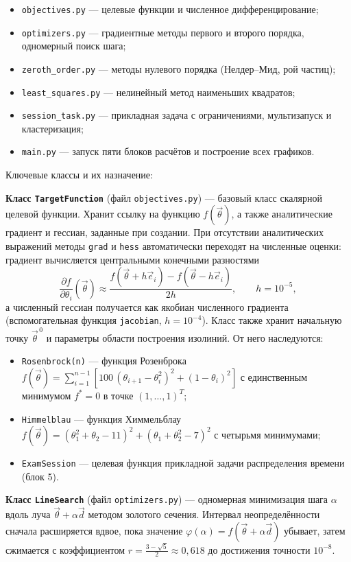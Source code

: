 \documentclass[a4paper]{article}
\begin{document}
\begin{itemize}
    \item \texttt{objectives.py} — целевые функции и численное дифференцирование;
    \item \texttt{optimizers.py} — градиентные методы первого и второго порядка, одномерный поиск шага;
    \item \texttt{zeroth\_order.py} — методы нулевого порядка (Нелдер–Мид, рой частиц);
    \item \texttt{least\_squares.py} — нелинейный метод наименьших квадратов;
    \item \texttt{session\_task.py} — прикладная задача с ограничениями, мультизапуск и кластеризация;
    \item \texttt{main.py} — запуск пяти блоков расчётов и построение всех графиков.
\end{itemize}

Ключевые классы и их назначение:

\textbf{Класс \texttt{TargetFunction}} (файл \texttt{objectives.py}) — базовый класс скалярной целевой функции. Хранит ссылку на функцию $f(\vec{\theta})$, а также аналитические градиент и гессиан, заданные при создании. При отсутствии аналитических выражений методы \texttt{grad} и \texttt{hess} автоматически переходят на численные оценки: градиент вычисляется центральными конечными разностями
\[
    \frac{\partial f}{\partial \theta_i}(\vec{\theta}) \approx
    \frac{f(\vec{\theta} + h \vec{e}_i) - f(\vec{\theta} - h \vec{e}_i)}{2h},
    \qquad h = 10^{-5},
\]
а численный гессиан получается как якобиан численного градиента (вспомогательная функция \texttt{jacobian}, $h = 10^{-4}$). Класс также хранит начальную точку $\vec{\theta}^{\,0}$ и параметры области построения изолиний. От него наследуются:
\begin{itemize}
    \item \texttt{Rosenbrock(n)} — функция Розенброка $f(\vec{\theta}) = \sum_{i=1}^{n-1}\left[100\,(\theta_{i+1} - \theta_i^2)^2 + (1 - \theta_i)^2\right]$ с единственным минимумом $f^* = 0$ в точке $(1, \dots, 1)^T$;
    \item \texttt{Himmelblau} — функция Химмельблау $f(\vec{\theta}) = (\theta_1^2 + \theta_2 - 11)^2 + (\theta_1 + \theta_2^2 - 7)^2$ с четырьмя минимумами;
    \item \texttt{ExamSession} — целевая функция прикладной задачи распределения времени (блок 5).
\end{itemize}

\textbf{Класс \texttt{LineSearch}} (файл \texttt{optimizers.py}) — одномерная минимизация шага $\alpha$ вдоль луча $\vec{\theta} + \alpha \vec{d}$ методом золотого сечения. Интервал неопределённости сначала расширяется вдвое, пока значение $\varphi(\alpha) = f(\vec{\theta} + \alpha \vec{d})$ убывает, затем сжимается с коэффициентом $r = \frac{3 - \sqrt{5}}{2} \approx 0{,}618$ до достижения точности $10^{-8}$.
\end{document}

